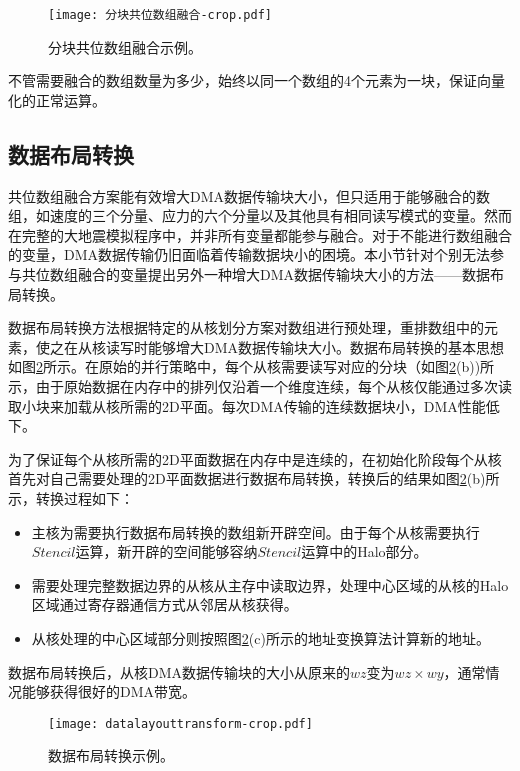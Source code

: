 \begin{figure}[ht]
\centering
\texttt{[image: 分块共位数组融合-crop.pdf]}
\caption{分块共位数组融合示例。}
\label{fig:block-fusion}
\end{figure}

不管需要融合的数组数量为多少，始终以同一个数组的4个元素为一块，保证向量化的正常运算。

\subsection{数据布局转换} %
\label{sub:数据布局转换}

共位数组融合方案能有效增大DMA数据传输块大小，但只适用于能够融合的数组，如速度的三个分量、应力的六个分量以及其他具有相同读写模式的变量。然而在完整的大地震模拟程序中，并非所有变量都能参与融合。对于不能进行数组融合的变量，DMA数据传输仍旧面临着传输数据块小的困境。本小节针对个别无法参与共位数组融合的变量提出另外一种增大DMA数据传输块大小的方法——数据布局转换。

数据布局转换方法根据特定的从核划分方案对数组进行预处理，重排数组中的元素，使之在从核读写时能够增大DMA数据传输块大小。数据布局转换的基本思想如图\ref{fig:layout-trans}所示。在原始的并行策略中，每个从核需要读写对应的分块（如图\ref{fig:layout-trans}(b))所示，由于原始数据在内存中的排列仅沿着一个维度连续，每个从核仅能通过多次读取小块来加载从核所需的2D平面。每次DMA传输的连续数据块小，DMA性能低下。

为了保证每个从核所需的2D平面数据在内存中是连续的，在初始化阶段每个从核首先对自己需要处理的2D平面数据进行数据布局转换，转换后的结果如图\ref{fig:layout-trans}(b)所示，转换过程如下：

\begin{itemize}
  \item 主核为需要执行数据布局转换的数组新开辟空间。由于每个从核需要执行$Stencil$运算，新开辟的空间能够容纳$Stencil$运算中的Halo部分。
  \item 需要处理完整数据边界的从核从主存中读取边界，处理中心区域的从核的Halo区域通过寄存器通信方式从邻居从核获得。
  \item 从核处理的中心区域部分则按照图\ref{fig:layout-trans}(c)所示的地址变换算法计算新的地址。
\end{itemize}   

数据布局转换后，从核DMA数据传输块的大小从原来的$wz$变为$wz\times wy$，通常情况能够获得很好的DMA带宽。

\begin{figure}[ht]
\centering
\texttt{[image: datalayouttransform-crop.pdf]}
\caption{数据布局转换示例。}
\label{fig:layout-trans}
\end{figure}

